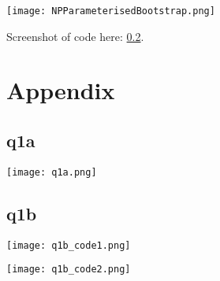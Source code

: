 \documentclass{article}
\begin{document}
\texttt{[image: NPParameterisedBootstrap.png]}

Screenshot of code here: \ref{code:q1b}.


\newpage
\section*{Appendix}

\subsection{q1a}
\label{code:q1a}
\texttt{[image: q1a.png]}

\subsection{q1b}
\label{code:q1b}
\texttt{[image: q1b\_code1.png]}

\texttt{[image: q1b\_code2.png]}
\end{document}
